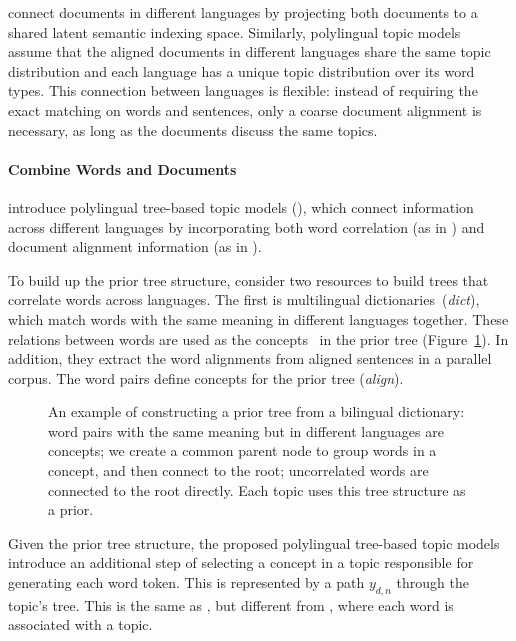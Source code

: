 \citet{Landauer-1990} connect documents in different languages by projecting both documents to a shared latent semantic indexing space. Similarly, 
polylingual topic models~\citep{mimno-09} assume that the aligned documents in different languages share the same topic distribution and each language has a unique topic distribution over its word types.  This connection between languages is flexible: instead of requiring the exact matching on words and sentences, only a coarse document alignment is necessary, as long as the documents discuss the same topics.

\paragraph{\bf Combine Words and Documents}

\citet{hu-14} introduce polylingual tree-based topic models (\ptlda{}), which connect information across different languages by incorporating both
word correlation (as in \tlda{}) and document alignment information (as in \plda{}). 

To build up the prior tree structure, \citet{hu-14} consider two resources to build trees that correlate words across languages. The first is multilingual dictionaries~(\textit{dict}), which match words with the same meaning in different languages together.  These relations between words are used as the concepts~\citep{Bhattacharya-2006} in the prior tree (Figure~\ref{fig:prior_trees}). In addition, they extract the word alignments from aligned sentences in a parallel corpus.  The word pairs define concepts for the prior tree (\textit{align}). 

\begin{figure}
\centering
\vspace{-3mm}
\caption[Constructing prior tree from a bilingual dictionary]{An example of constructing a prior tree from a
  bilingual dictionary: word pairs with the same meaning but in
  different languages are concepts; we create a common parent node to
  group words in a concept, and then connect to the root;
  uncorrelated words are connected to the root directly.  Each topic
  uses this tree structure as a prior. }
\label{fig:prior_trees}
\end{figure}

Given the prior tree structure, the proposed polylingual tree-based topic models introduce an additional step of selecting a concept in a topic responsible for generating each word token. This is represented by a path $y_{d,n}$ through the topic's tree. This is the same as \tlda{}, but different from , where each word is associated with a topic. 

